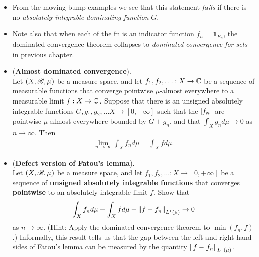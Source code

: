 \documentclass[11pt]{article}
\begin{document}
\begin{itemize}
\item \begin{remark}
From the moving bump examples we see that this statement \emph{fails} if there is no \emph{absolutely integrable dominating function} $G$. 
\end{remark}

\item \begin{remark}
Note also that when each of the fn is an indicator function $f_n= \mathds{1}_{E_n}$, the dominated convergence theorem collapses to \emph{dominated convergence for sets} in previous chapter.
\end{remark}

\item \begin{proposition} (\textbf{Almost dominated convergence}). \\
Let $(X, {\mathscr B}, \mu)$ be a measure space, and let $f_1, f_2, \ldots: X \rightarrow {\mathbb C}$ be a sequence of measurable functions that converge pointwise $\mu$-almost everywhere to a measurable limit $f : X \rightarrow {\mathbb C}$. Suppose that there is an unsigned absolutely integrable functions $G, g_1, g_2, \ldots X \rightarrow [0, +\infty]$ such that the $\left\lvert f_n \right\rvert$ are pointwise $\mu$-almost everywhere bounded by $G + g_n$, and that $\int_X g_n d\mu \rightarrow 0$ as $n \rightarrow \infty$. Then
\begin{align*}
\lim\limits_{n\rightarrow \infty} \int_X f_n d\mu = \int_X f d\mu.
\end{align*}
\end{proposition}

\item \begin{exercise}  (\textbf{Defect version of Fatou's lemma}). \\
Let $(X, {\mathscr B}, \mu)$ be a measure space, and let $f_1, f_2, \ldots: X \rightarrow [0, +\infty]$ be a sequence of \textbf{unsigned absolutely integrable functions} that converges \textbf{pointwise} to an absolutely integrable limit $f$. Show that
\begin{align*}
\int_X f_n d\mu - \int_X f d\mu - \left\|f - f_n\right\|_{L^1(\mu)} \rightarrow 0
\end{align*} as $n \rightarrow \infty$. (Hint: Apply the dominated convergence theorem to $\min(f_n, f)$.) Informally, this result tells us that the gap between the left and right hand sides of Fatou’s lemma can be measured by the quantity $\left\|f - f_n\right\|_{L^1(\mu)}$.
\end{exercise}


\end{itemize}
\end{document}
